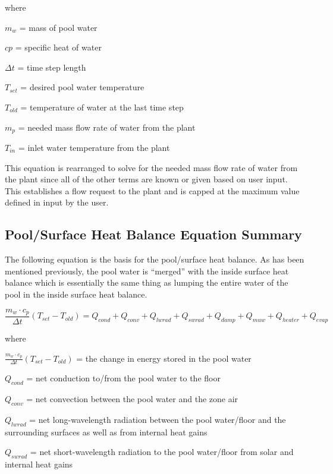 where

\(m_w\) = mass of pool water

\(cp\) = specific heat of water

\(\Delta t\) = time step length

\(T_{set}\) = desired pool water temperature

\(T_{old}\) = temperature of water at the last time step

\(m_p\) = needed mass flow rate of water from the plant

\(T_{in}\) = inlet water temperature from the plant

This equation is rearranged to solve for the needed mass flow rate of water from the plant since all of the other terms are known or given based on user input. This establishes a flow request to the plant and is capped at the maximum value defined in input by the user.

\subsection{Pool/Surface Heat Balance Equation Summary}\label{poolsurface-heat-balance-equation-summary}

The following equation is the basis for the pool/surface heat balance. As has been mentioned previously, the pool water is ``merged'' with the inside surface heat balance which is essentially the same thing as lumping the entire water of the pool in the inside surface heat balance.

\begin{equation}
\frac{m_w \cdot c_p}{\Delta t} (T_{set} - T_{old}) = Q_{cond} + Q_{conv} + Q_{lwrad} + Q_{swrad} + Q_{damp} + Q_{muw} + Q_{heater} + Q_{evap}
\end{equation}

where

\(\frac{m_w \cdot c_p}{\Delta t} (T_{set} - T_{old} )\) = the change in energy stored in the pool water

\(Q_{cond}\) = net conduction to/from the pool water to the floor

\(Q_{conv}\) = net convection between the pool water and the zone air

\(Q_{lwrad}\) = net long-wavelength radiation between the pool water/floor and the surrounding surfaces as well as from internal heat gains

\(Q_{swrad}\) = net short-wavelength radiation to the pool water/floor from solar and internal heat gains

